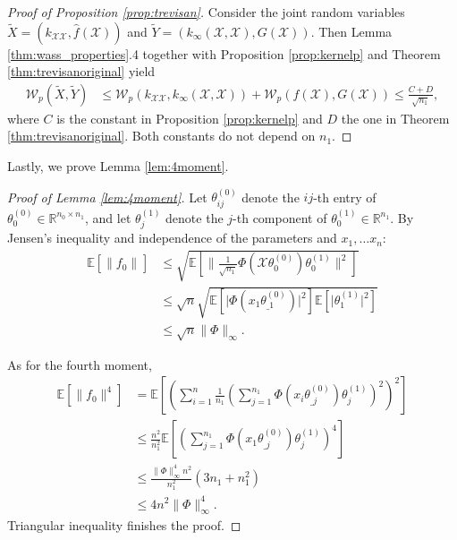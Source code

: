 \documentclass{article}
\theoremstyle{definition}
\theoremstyle{remark}
\numberwithin{equation}{section}
\newcommand{\X}{\mathcal{X}}
\newcommand{\R}{\mathbb{R}}
\newcommand{\E}{\mathbb{E}}
\newcommand{\ktrain}{k_{\X\X}}
\newcommand{\norm}[2]{
    \|#1\|_{#2}
}
\begin{document}
\begin{proof}[Proof of Proposition \ref{prop:trevisan}]

    Consider the joint random variables $\tilde X = (\ktrain,\hat f(\X))$ and $\tilde Y = (k_\infty(\X,\X),G(\X))$.
Then Lemma \ref{thm:wass_properties}.4 together with Proposition \ref{prop:kernelp} and Theorem \ref{thm:trevisanoriginal} yield
\begin{align}
    \mathcal W_p(\tilde X, \tilde Y) &\le \mathcal W_p(\ktrain,k_\infty(\X,\X)) + \mathcal W_p(f(\X),G(\X)) \le \frac{C+D}{\sqrt{n_1}},
\end{align}
where $C$ is the constant in Proposition \ref{prop:kernelp} and $D$ the one in Theorem \ref{thm:trevisanoriginal}.
Both constants do not depend on $n_1$.
\end{proof}

Lastly, we prove Lemma \ref{lem:4moment}.

\begin{proof}[Proof of Lemma \ref{lem:4moment}]
    Let $\theta^{(0)}_{ij}$ denote the $ij$-th entry of $\theta^{(0)}_0 \in \R^{n_0\times n_1}$, and let $\theta^{(1)}_j$ denote the $j$-th component of $\theta^{(1)}_0 \in \R^{n_1}$.
    By Jensen's inequality and independence of the parameters and $x_1, \ldots x_n$:
    \begin{align}
        \E[\norm{f_0}{}] &\le \sqrt{\E[\norm{\frac{1}{\sqrt{n_1}}\Phi(\X\theta^{(0)}_0)\theta^{(1)}_0}{}^2]} \\
        &\le \sqrt{n}\sqrt{\E[\vert \Phi(x_1\theta^{(0)}_{\_ 1})\vert^2]\E[\vert \theta^{(1)}_1\vert^2]} \\
        &\le \sqrt{n}\norm{\Phi}{\infty}.
    \end{align}

    As for the fourth moment,
    \begin{align}
        \E[\norm{f_0}{}^4] &= \E\left[\left(\sum_{i=1}^n\frac{1}{n_1}\left(\sum_{j=1}^{n_1}\Phi(x_i\theta^{(0)}_{\_ j})\theta^{(1)}_j\right)^2\right)^2\right] \\
        &\le \frac{n^2}{n_1^2}\E\left[\left(\sum_{j=1}^{n_1}\Phi(x_1\theta^{(0)}_{\_ j})\theta^{(1)}_j\right)^4\right] \\
        &\le \frac{\norm{\Phi}{\infty}^4n^2}{n_1^2}(3n_1 + n_1^2) \\
        &\le 4 n^2 \norm{\Phi}{\infty}^4.
    \end{align}
    Triangular inequality finishes the proof.
\end{proof}
\end{document}
